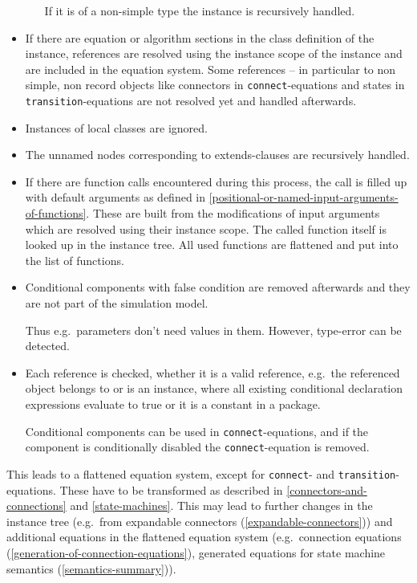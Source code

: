 \begin{itemize}
\begin{itemize}
    If it is of a non-simple type the instance is recursively handled.
  \end{itemize}
\item
  If there are equation or algorithm sections in the class definition of the instance, references are resolved using the instance scope of the instance and are included in the equation system.
  Some references -- in particular to non simple, non record objects like connectors in \lstinline!connect!-equations and states in \lstinline!transition!-equations are not resolved yet and handled afterwards.
\item
  Instances of local classes are ignored.
\item
  The unnamed nodes corresponding to extends-clauses are recursively
  handled.
\item
  If there are function calls encountered during this process, the call
  is filled up with default arguments as defined in \cref{positional-or-named-input-arguments-of-functions}. These are
  built from the modifications of input arguments which are resolved
  using their instance scope. The called function itself is looked up in
  the instance tree. All used functions are flattened and put into the
  list of functions.
\item
  Conditional components with false condition are removed afterwards and
  they are not part of the simulation model.
  \begin{nonnormative}
  Thus e.g.\ parameters don't need values in them. However, type-error can be detected.
  \end{nonnormative}
\item
  Each reference is checked, whether it is a valid reference, e.g.\ the
  referenced object belongs to or is an instance, where all existing
  conditional declaration expressions evaluate to true or it is a
  constant in a package.
  \begin{nonnormative}
  Conditional components can be used in \lstinline!connect!-equations, and if the component is conditionally disabled the \lstinline!connect!-equation is removed.
  \end{nonnormative}
\end{itemize}

This leads to a flattened equation system, except for \lstinline!connect!- and \lstinline!transition!-equations.
These have to be transformed as described in \cref{connectors-and-connections} and \cref{state-machines}.
This may lead to further changes in the instance tree (e.g.\ from expandable connectors (\cref{expandable-connectors})) and additional equations in the flattened equation system (e.g.\ connection equations (\cref{generation-of-connection-equations}), generated equations for state machine semantics (\cref{semantics-summary})).


